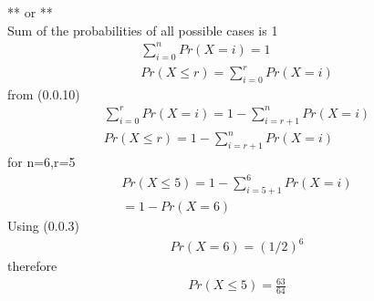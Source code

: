 \documentclass[journal,12pt,twocolumn]{IEEEtran}
\begin{document}
\begin{enumerate}
        **     or **\\
       Sum of the probabilities of all possible cases is 1\\
    \begin{align}
        \sum^{n}_{i=0}Pr(X=i)=1\\
        Pr(X\leq r)=\sum^{r}_{i=0}Pr(X=i)
    \end{align}
        from (0.0.10)\\
    \begin{align}
        \sum^{r}_{i=0}Pr(X=i)=1-\sum^{n}_{i=r+1}Pr(X=i)\\
        Pr(X\leq r)=1-\sum^{n}_{i=r+1}Pr(X=i)
    \end{align}
    for n=6,r=5
    \begin{align}
        Pr(X\leq5)=1-\sum^{6}_{i=5+1}Pr(X=i)\\
        =1-Pr(X=6)
    \end{align}
    Using (0.0.3)
    \begin{align}
       Pr(X=6)=(1/2)^6
    \end{align}
    therefore
    \begin{align}
      Pr(X\leq5)=\frac{63}{64}
    \end{align}
\end{enumerate}
\end{document}
